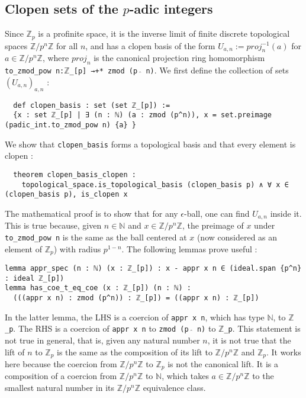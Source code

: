 \documentclass[a4paper,UKenglish,cleveref, autoref, thm-restate]{lipics-v2021}
\newcommand{\lean}[1]{\texttt{#1}\xspace} %
\begin{document}
\subsection{Clopen sets of the $p$-adic integers}
Since $\mathbb{Z}_p$ is a profinite space, it is the inverse limit of finite
discrete topological spaces $\mathbb{Z}/p^n \mathbb{Z}$ for all $n$, and has a clopen basis of the
form $U_{a,n} := proj_n ^{-1} (a)$ for $a \in \mathbb{Z}/p^n \mathbb{Z}$, where $proj_n$ is the
canonical projection ring homomorphism \lean{to\_zmod\_pow n:$\mathbb{Z}$\_[p] →+* zmod (p $\hat{}$ n)}. 
We first define the collection of sets $(U_{a,n})_{a,n}$ :
\begin{lstlisting}
  def clopen_basis : set (set ℤ_[p]) := 
  {x : set ℤ_[p] | ∃ (n : ℕ) (a : zmod (p^n)), x = set.preimage (padic_int.to_zmod_pow n) {a} }
\end{lstlisting}
We show that \lean{clopen\_basis} forms a topological basis and that every element is
clopen :
\begin{lstlisting}
  theorem clopen_basis_clopen : 
    topological_space.is_topological_basis (clopen_basis p) ∧ ∀ x ∈ (clopen_basis p), is_clopen x
\end{lstlisting}
The mathematical proof is to show that for any $\epsilon$-ball, one can find $U_{a,n}$ inside it.
This is true because, given $n \in \mathbb{N}$ and $x \in \mathbb{Z} / p^n \mathbb{Z}$, the preimage of $x$ 
under \lean{to\_zmod\_pow n} is the same as the ball centered at $x$ (now considered as an element of $\mathbb{Z}_p$) with radius $p^{1 - n}$. 
The following lemmas prove useful :
\begin{lstlisting}
lemma appr_spec (n : ℕ) (x : ℤ_[p]) : x - appr x n ∈ (ideal.span {p^n} : ideal ℤ_[p])
lemma has_coe_t_eq_coe (x : ℤ_[p]) (n : ℕ) : 
  (((appr x n) : zmod (p^n)) : ℤ_[p]) = ((appr x n) : ℤ_[p])
\end{lstlisting}
In the latter lemma, the LHS is a coercion of \lean{appr x n}, which has type \lean{$\mathbb{N}$}, to \lean{$\mathbb{Z}$\_p}. 
The RHS is a coercion of \lean{appr x n} to \lean{zmod (p $\hat{}$ n)} to \lean{$\mathbb{Z}$\_p}. 
This statement is not true in general, that is, given any natural number $n$, it is not true that the lift of $n$ to $\mathbb{Z}_p$ 
is the same as the composition of its lift to $\mathbb{Z}/p^n \mathbb{Z}$ and $\mathbb{Z}_p$. 
It works here because the coercion from $\mathbb{Z}/p^n \mathbb{Z}$ to $\mathbb{Z}_p$ is not the canonical lift.
It is a composition of a coercion from $\mathbb{Z}/p^n \mathbb{Z}$ to $\mathbb{N}$, which takes
$a \in \mathbb{Z}/p^n \mathbb{Z}$ to the smallest natural number in its
$\mathbb{Z}/p^n \mathbb{Z}$ equivalence class. 
\end{document}
